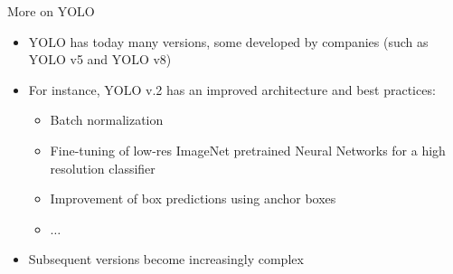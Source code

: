 \documentclass[xcolor=pdftex,dvipsnames,table]{beamer}
\begin{document}
\begin{frame}{More on YOLO}
\begin{itemize}
   \item YOLO has today many versions, some developed by companies (such as YOLO v5 and YOLO v8)
   \item For instance, YOLO v.2 has an improved architecture and best practices: 
   \begin{itemize}
      \item Batch normalization
      \item Fine-tuning of low-res ImageNet pretrained Neural Networks for a high resolution classifier 
      \item Improvement of box predictions using anchor boxes
      \item $\ldots$
   \end{itemize}
   \item Subsequent versions become increasingly complex
\end{itemize}
\end{frame}

\end{document}
